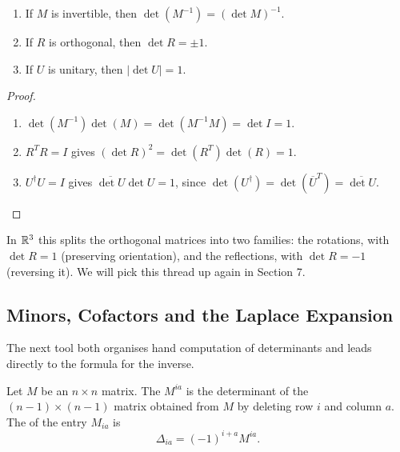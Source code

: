 \documentclass[a4paper]{scrartcl}
\begin{document}
\begin{corollary}
	\begin{enumerate}[label=(\roman*)]
		\item If $M$ is invertible, then $\det (M^{-1}) = (\det M)^{-1}$.
		\item If $R$ is orthogonal, then $\det R = \pm 1$.
		\item If $U$ is unitary, then $|\det U| = 1$.
	\end{enumerate}
\end{corollary}
\begin{proof}
	\begin{enumerate}[label=(\roman*)]
		\item $\det(M^{-1})\det(M) = \det(M^{-1}M) = \det I = 1$.
		\item $R^TR = I$ gives $(\det R)^2 = \det(R^T)\det(R) = 1$.
		\item $U^\dagger U = I$ gives $\overline{\det U} \det U = 1$, since $\det (U^\dagger) = \det(\overline{U}^T) = \overline{\det U}$. \qedhere
	\end{enumerate}
\end{proof}

In $\mathbb{R}^3$ this splits the orthogonal matrices into two families: the rotations, with $\det R = 1$ (preserving orientation), and the reflections, with $\det R = -1$ (reversing it). We will pick this thread up again in Section 7.

\subsection{Minors, Cofactors and the Laplace Expansion}

The next tool both organises hand computation of determinants and leads directly to the formula for the inverse.

\begin{definition}
	Let $M$ be an $n \times n$ matrix. The  $M^{ia}$ is the determinant of the $(n-1) \times (n-1)$ matrix obtained from $M$ by deleting row $i$ and column $a$. The  of the entry $M_{ia}$ is
	$$
	\Delta_{ia} = (-1)^{i + a}M^{ia}.
	$$
\end{definition}
\end{document}
